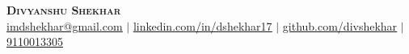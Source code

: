 \documentclass[letterpaper,11pt]{article}
\makeatletter
\newcommand{\resumeItem}[1]{
  \item\small{
    {#1 \vspace{-2pt}}
  }
}
\newcommand{\resumeSubheading}[4]{
  \vspace{-2pt}\item
    \begin{tabular*}{0.97\textwidth}[t]{l@{\extracolsep{\fill}}r}
      \textbf{#1} & #2 \\
      \textit{\small#3} & \textit{\small #4} \\
    \end{tabular*}\vspace{-7pt}
}
\newcommand{\resumeSubSubheading}[2]{
    \item
    \begin{tabular*}{0.97\textwidth}{l@{\extracolsep{\fill}}r}
      \textit{\small#1} & \textit{\small #2} \\
    \end{tabular*}\vspace{-7pt}
}
\newcommand{\resumeSubHeadingListStart}{\begin{itemize}[leftmargin=0.15in, label={}]}
\newcommand{\resumeSubHeadingListEnd}{\end{itemize}}
\newcommand{\resumeItemListStart}{\begin{itemize}}
\newcommand{\resumeItemListEnd}{\end{itemize}\vspace{-5pt}}
\makeatother
\begin{document}

\begin{center}
    \textbf{\Huge \scshape Divyanshu Shekhar} \\ \vspace{1pt}
    \href{mailto:imdshekhar@gmail.com}{\underline{imdshekhar@gmail.com}} $|$  
    \href{https://linkedin.com/in/dshekhar17}{\underline{linkedin.com/in/dshekhar17}} $|$
    \href{https://github.com/divshekhar}{\underline{github.com/divshekhar}} $|$
    \href{tel:+919110013305} {\underline{9110013305}}
    
\end{center}


        
    
       
\end{document}
